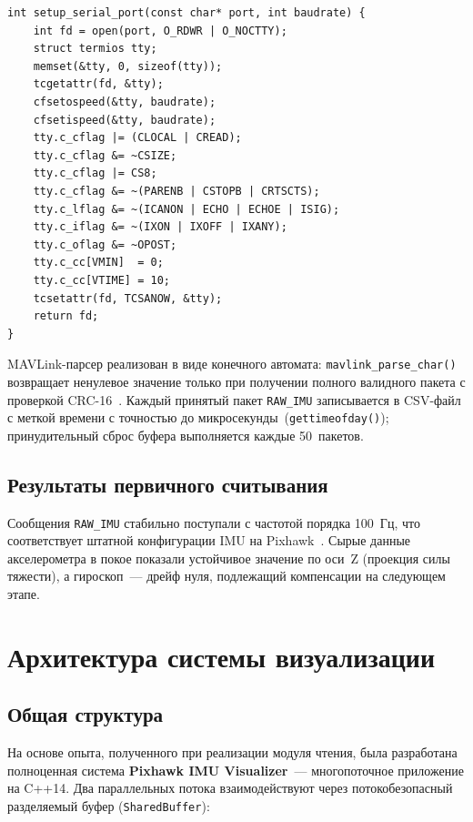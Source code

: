 \begin{lstlisting}[caption={Настройка последовательного порта через termios}]
int setup_serial_port(const char* port, int baudrate) {
    int fd = open(port, O_RDWR | O_NOCTTY);
    struct termios tty;
    memset(&tty, 0, sizeof(tty));
    tcgetattr(fd, &tty);
    cfsetospeed(&tty, baudrate);
    cfsetispeed(&tty, baudrate);
    tty.c_cflag |= (CLOCAL | CREAD);
    tty.c_cflag &= ~CSIZE;
    tty.c_cflag |= CS8;
    tty.c_cflag &= ~(PARENB | CSTOPB | CRTSCTS);
    tty.c_lflag &= ~(ICANON | ECHO | ECHOE | ISIG);
    tty.c_iflag &= ~(IXON | IXOFF | IXANY);
    tty.c_oflag &= ~OPOST;
    tty.c_cc[VMIN]  = 0;
    tty.c_cc[VTIME] = 10;
    tcsetattr(fd, TCSANOW, &tty);
    return fd;
}
\end{lstlisting}
 
MAVLink-парсер реализован в виде конечного автомата:
\texttt{mavlink\_parse\_char()} возвращает ненулевое значение только
при получении полного валидного пакета с проверкой CRC-16~\cite{mavlink_proto}.
Каждый принятый пакет \texttt{RAW\_IMU} записывается в CSV-файл с меткой
времени с точностью до микросекунды~(\texttt{gettimeofday()}); принудительный
сброс буфера выполняется каждые 50~пакетов.
 
\subsection{Результаты первичного считывания}
 
Сообщения \texttt{RAW\_IMU} стабильно поступали с частотой порядка
100~Гц, что соответствует штатной конфигурации IMU на
Pixhawk~\cite{px4_docs}. Сырые данные акселерометра в покое показали
устойчивое значение по оси~Z (проекция силы тяжести), а гироскоп~---
дрейф нуля, подлежащий компенсации на следующем этапе.
 
\newpage
 
\section{Архитектура системы визуализации}
 
\subsection{Общая структура}
 
На основе опыта, полученного при реализации модуля чтения, была
разработана полноценная система \textbf{Pixhawk IMU Visualizer}~---
многопоточное приложение на C++14. Два параллельных потока взаимодействуют
через потокобезопасный разделяемый буфер (\texttt{SharedBuffer}):
 
